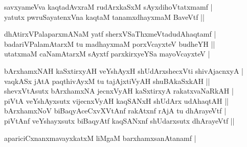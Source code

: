 \begin{entry}
\begin{shl}
savxyameVva kaqtadAvxraM rudArxkaSxM sAyxdihoVtatxmamf |\\[2pt]
yatutx pwruSayatenxVna kaqtaM tanamxdhayxmaM BaveVtf ||\\[-1pt]
\end{shl}
\medskip
{}
\smallskip
{}
\medskip
\begin{shl}
dhAtirxVPalaparxmANaM yatf sherxVSaThxmeVtadudAhaqtamf |\\[2pt]
badariVPalamAtarxM tu madhayxmaM porxVcayxteV budheYH ||\\[2pt]
utatxmaM caNamAtarxM sAyxtf parxkirxyeYSa mayoVcayxteV |\\[-1pt]
\end{shl}
\medskip
{}
\smallskip
{}
\medskip
\begin{shl}
bArxhamxNAH kaSxtirxyAH veYshAyxH shUdArxshecxVti shivAjacnxyA |\\[2pt]
vaqkASx jAtA paqthivAyxM tu tajAjxtiVyAH shuBAkaSxkAH ||\\[2pt]
shevxVtAsutx bArxhamxNA jecnxVyAH kaSxtirxyA rakatxvaNaRkAH |\\[2pt]
piVtA veYshAyxsutx vijecnxVyAH kaqSANxH shUdArx udAhaqtAH ||\\[2pt]
bArxhamxNoV biBaqyAceCxvXVtAnf rakAtxnf rAjA tu dhArayeVtf |\\[2pt]
piVtAnf veYshayxsutx biBaqyAtf kaqSANxnf shUdarxsutx dhArayeVtf ||\\[-1pt]
\end{shl}
\medskip
{}
\smallskip
{}
\medskip
\begin{shl}
apariciCxnanxmavayxkatxM liMgaM barxhamxsanAtanamf |\\[-1pt]
\end{shl}

\end{entry}
